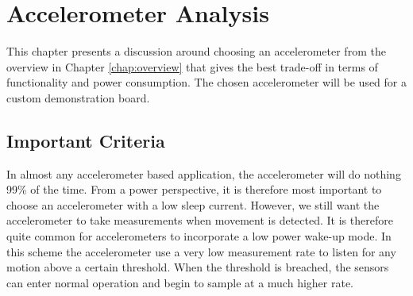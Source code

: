 \chapter{Accelerometer Analysis}

This chapter presents a discussion around choosing an accelerometer from the overview in Chapter \ref{chap:overview} that gives the best trade-off in terms of functionality and power consumption. The chosen accelerometer will be used for a custom demonstration board.

\section{Important Criteria}

In almost any accelerometer based application, the accelerometer will do nothing 99\% of the time. From a power perspective, it is therefore most important to choose an accelerometer with a low sleep current. However, we still want the accelerometer to take measurements when movement is detected. It is therefore quite common for accelerometers to incorporate a low power wake-up mode. In this scheme the accelerometer use a very low measurement rate to listen for any motion above a certain threshold. When the threshold is breached, the sensors can enter normal operation and begin to sample at a much higher rate. 

